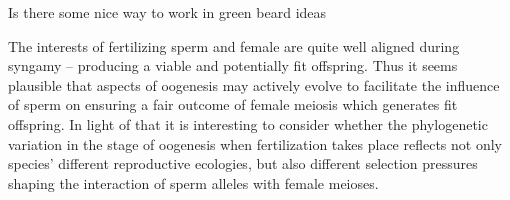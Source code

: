 \documentclass[12pt,letterpaper]{article}
\newcommand{\gc}[1]{{ \color{red} #1}}
\newcommand{\yb}[1]{{ \color{blue} #1}}
\begin{document}


\gc{Is there some nice way to work in green beard ideas}


The interests of fertilizing sperm and female are quite well aligned during syngamy -- producing a viable and potentially fit offspring. 
Thus it seems plausible that aspects of oogenesis may actively evolve to facilitate the influence of sperm on ensuring a fair  outcome of female meiosis which generates fit offspring.
In light of that it is interesting to consider whether the phylogenetic variation in the stage of oogenesis when fertilization takes place reflects not
	only species' different reproductive ecologies, but also different selection pressures shaping the interaction of sperm alleles with female meioses. 






  \appendix
\end{document}
